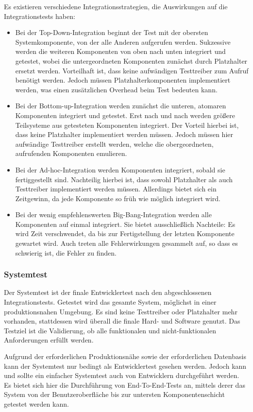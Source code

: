 Es existieren verschiedene Integrationsstrategien, die Auswirkungen auf die Integrationstests haben:\cite[][59\psq]{spillner}
\begin{itemize}
	\item Bei der Top-Down-Integration beginnt der Test mit der obersten Systemkomponente, von der alle Anderen aufgerufen werden. Sukzessive werden die weiteren Komponenten von oben nach unten integriert und getestet, wobei die untergeordneten Komponenten zunächst durch Platzhalter ersetzt werden. Vorteilhaft ist, dass keine aufwändigen Testtreiber zum Aufruf benötigt werden. Jedoch müssen Platzhalterkomponenten implementiert werden, was einen zusätzlichen Overhead beim Test bedeuten kann.
	\item Bei der Bottom-up-Integration werden zunächst die unteren, atomaren Komponenten integriert und getestet. Erst nach und nach werden größere Teilsysteme aus getesteten Komponenten integriert. Der Vorteil hierbei ist, dass keine Platzhalter implementiert werden müssen. Jedoch müssen hier aufwändige Testtreiber erstellt werden, welche die obergeordneten, aufrufenden Komponenten emulieren.
	\item Bei der Ad-hoc-Integration werden Komponenten integriert, sobald sie fertiggestellt sind. Nachteilig hierbei ist, dass sowohl Platzhalter als auch Testtreiber implementiert werden müssen. Allerdings bietet sich ein Zeitgewinn, da jede Komponente so früh wie möglich integriert wird.
	\item Bei der wenig empfehlenswerten Big-Bang-Integration werden alle Komponenten auf einmal integriert. Sie bietet ausschließlich Nachteile: Es wird Zeit verschwendet, da bis zur Fertigstellung der letzten Komponente gewartet wird. Auch treten alle Fehlerwirkungen gesammelt auf, so dass es schwierig ist, die Fehler zu finden.
\end{itemize}

\subsubsection{Systemtest}
Der Systemtest ist der finale Entwicklertest nach den abgeschlossenen Integrationstests. Getestet wird das gesamte System, möglichst in einer produktionsnahen Umgebung. Es sind keine Testtreiber oder Platzhalter mehr vorhanden, stattdessen wird überall die finale Hard- und Software genutzt. Das Testziel ist die Validierung, ob alle funktionalen und nicht-funktionalen Anforderungen erfüllt werden.\cite[][60\psqq]{spillner}

Aufgrund der erforderlichen Produktionsnähe sowie der erforderlichen Datenbasis kann der Systemtest nur bedingt als Entwicklertest gesehen werden\cites[236]{roitzsch}[]{oose}. Jedoch kann und sollte ein einfacher Systemtest auch von Entwicklern durchgeführt werden. Es bietet sich hier die Durchführung von End-To-End-Tests an, mittels derer das System von der Benutzeroberfläche bis zur untersten Komponentenschicht getestet werden kann\cite{softwaresanierung}.